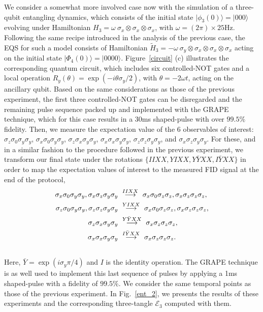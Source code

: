 \documentclass[10pt,nofootinbib,notitlepage,twocolumn,superscriptaddress]{revtex4-1}
\theoremstyle{plain}
\theoremstyle{definition}
\newcommand{\ket}[1]{\ensuremath{|#1\rangle}}
\begin{document}
We consider a somewhat more involved case now with the simulation of a three-qubit entangling dynamics, which consists of the initial state $\ket{\phi_3(0)}=\ket{000}$ evolving under Hamiltonian ${H_3= \omega\  \sigma_x\otimes \sigma_x\otimes \sigma_x}$, with $\omega=(2\pi) \times 25$Hz. Following the same recipe introduced in the analysis of the previous case, the EQS for such a model consists of Hamiltonian $\tilde{H}_3=-\omega \ \sigma_y\otimes \sigma_x\otimes \sigma_x\otimes \sigma_x$ acting on the initial state $\ket{\Phi_4(0)}=\ket{0000}$.  Figure~\ref{circuit} (c) illustrates the corresponding quantum circuit, which includes six controlled-NOT gates and a local operation $R_y(\theta)=\exp(-i\theta\sigma_y/2)$, with $\theta=- 2 \omega t $, acting on the ancillary qubit. Based on the same considerations as those of the previous experiment, the first three controlled-NOT gates can be disregarded and the remaining pulse sequence packed up and implemented with the GRAPE technique, which for this case results in a 30ms shaped-pulse with over $99.5\%$ fidelity. Then, we measure the expectation value of the $6$ observables of interest: $\sigma_z\sigma_0\sigma_y\sigma_y$, $\sigma_x\sigma_0\sigma_y\sigma_y$, $\sigma_z\sigma_x\sigma_y\sigma_y$, $\sigma_x\sigma_x\sigma_y\sigma_y$, $\sigma_z\sigma_z\sigma_y\sigma_y$, and $\sigma_x\sigma_z\sigma_y\sigma_y$. For these, and in a similar fashion to the procedure followed in the previous experiment, we transform our final state under the rotations $\{IIXX, YIXX, Y\bar{Y}XX,I\bar{Y}XX\}$ in order to map the expectation values of interest to the measured FID signal at the end of the protocol,
\begin{align}
\sigma_x\sigma_0\sigma_y\sigma_y, \sigma_x\sigma_z\sigma_y\sigma_y~& \stackrel{\large IIXX}{\longrightarrow}~\sigma_x\sigma_0\sigma_z\sigma_z, \sigma_x\sigma_z\sigma_z\sigma_z,\\\nonumber
\sigma_z\sigma_0\sigma_y\sigma_y, \sigma_z\sigma_z\sigma_y\sigma_y~&  \stackrel{\large YIXX}{\longrightarrow}~\sigma_x\sigma_0\sigma_z\sigma_z, \sigma_x\sigma_z\sigma_z\sigma_z,\\\nonumber
\sigma_z\sigma_x\sigma_y\sigma_y~& \stackrel{\large Y\bar{Y}XX}{\longrightarrow}~ \sigma_x\sigma_z\sigma_z\sigma_z, \\\nonumber
\sigma_x\sigma_x\sigma_y\sigma_y~& \stackrel{\large I\bar{Y}XX}{\longrightarrow}~ \sigma_x\sigma_z\sigma_z\sigma_z.\\\nonumber
\end{align}
Here, $\bar{Y}=\exp(i\sigma_y\pi/4)$ and $I$ is the identity operation. The GRAPE technique is as well used to implement this last sequence of pulses by applying a 1ms shaped-pulse with a fidelity of $99.5\%$. We consider the same temporal points as those of the previous experiment. In Fig.~\ref{ent_2}, we presents the results of these experiments and the corresponding three-tangle $\mathcal{E}_3$ computed with them. 
\end{document}

